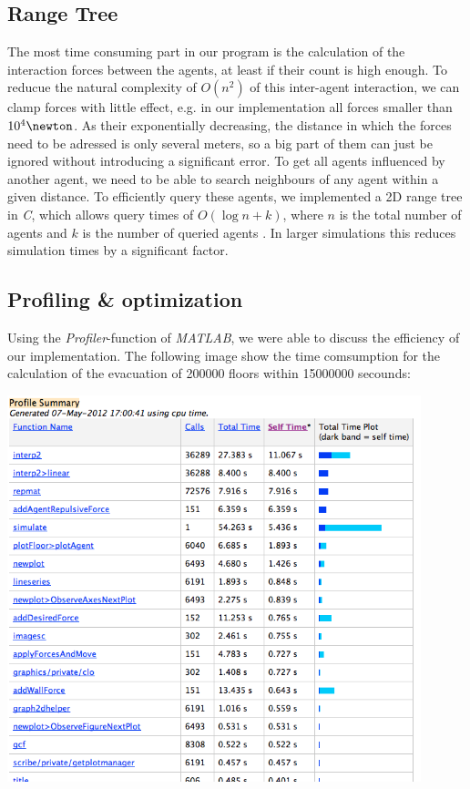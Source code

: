 \documentclass[11pt]{article}
\begin{document}
\subsection{Range Tree}
The most time consuming part in our program is the calculation of the interaction forces between the agents, at least if their count is high enough. To reducue the natural complexity of $O(n^{2})$ of this inter-agent interaction, we can clamp forces with little effect, e.g. in our implementation all forces smaller than $ 10^{4}\newton$. As their exponentially decreasing, the distance in which the forces need to be adressed is only several meters, so a big part of them can just be ignored without introducing a significant error.
To get all agents influenced by another agent, we need to be able to search neighbours of any agent within a given distance. To efficiently query these agents, we implemented a 2D range tree in \textit{C}, which allows query times of $O(\log n+k)$, where $n$ is the total number of agents and $k$ is the number of queried agents \cite{algdat}. In larger simulations this reduces simulation times by a significant factor.


\subsection{Profiling \& optimization}



Using the \textit{Profiler}-function of \textit{MATLAB}, we were able to discuss the efficiency of our implementation. The following image show the time comsumption for the calculation of the evacuation of 200000 floors within 15000000 secounds: %

\medskip

\begin{center}
	\includegraphics[width=0.9\textwidth]{./images/profiler.png}
\end{center}
\end{document}

